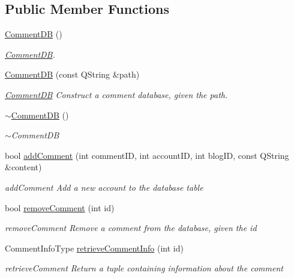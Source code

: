 \subsection*{Public Member Functions}
\begin{DoxyCompactItemize}
\item 
\hyperlink{classCommentDB_ac5d0c5ea3bcfc16bd08522eab40f96c5}{Comment\+DB} ()
\begin{DoxyCompactList}\small\item\em \hyperlink{classCommentDB}{Comment\+DB}. \end{DoxyCompactList}\item 
\hyperlink{classCommentDB_a6b8fd5bb5b5116016103199773817917}{Comment\+DB} (const Q\+String \&path)
\begin{DoxyCompactList}\small\item\em \hyperlink{classCommentDB}{Comment\+DB} Construct a comment database, given the path. \end{DoxyCompactList}\item 
\hyperlink{classCommentDB_a2b4336fab794dad2d02b56fe57cc3ab8}{$\sim$\+Comment\+DB} ()
\begin{DoxyCompactList}\small\item\em $\sim$\+Comment\+DB \end{DoxyCompactList}\item 
bool \hyperlink{classCommentDB_ad06b4ae25b54125d9873aa726679c088}{add\+Comment} (int comment\+ID, int account\+ID, int blog\+ID, const Q\+String \&content)
\begin{DoxyCompactList}\small\item\em add\+Comment Add a new account to the database table \end{DoxyCompactList}\item 
bool \hyperlink{classCommentDB_aede2f63d31cc304a7622d2751d9ae777}{remove\+Comment} (int id)
\begin{DoxyCompactList}\small\item\em remove\+Comment Remove a comment from the database, given the id \end{DoxyCompactList}\item 
Comment\+Info\+Type \hyperlink{classCommentDB_ad8bbd99b0ce3aca13c6793bccfdaf08d}{retrieve\+Comment\+Info} (int id)
\begin{DoxyCompactList}\small\item\em retrieve\+Comment Return a tuple containing information about the comment \end{DoxyCompactList}\item 

\end{DoxyCompactItemize}

